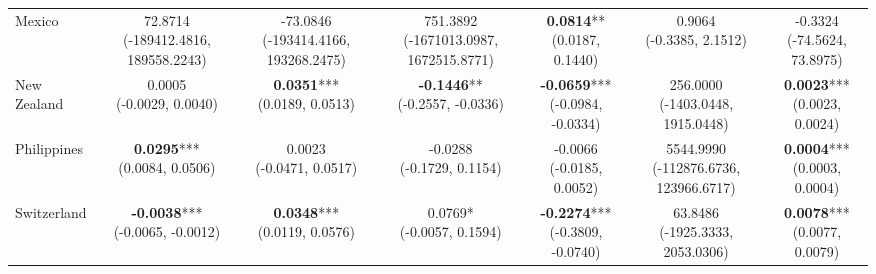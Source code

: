 \documentclass[a4paper,10pt,final]{article}    %
\begin{document}
\begin{table}[htbp]
{\begin{tabular}{l|cccccc}
            Mexico         & \makecell{72.8714                                                                   \\ \scriptsize{(-189412.4816, 189558.2243)}} & \makecell{-73.0846 \\ \scriptsize{(-193414.4166, 193268.2475)}} & \makecell{751.3892 \\ \scriptsize{(-1671013.0987, 1672515.8771)}} & \makecell{\textbf{0.0814}** \\ \scriptsize{(0.0187, 0.1440)}} & \makecell{0.9064 \\ \scriptsize{(-0.3385, 2.1512)}} & \makecell{-0.3324 \\ \scriptsize{(-74.5624, 73.8975)}} \\
            New Zealand    & \makecell{0.0005                                                                    \\ \scriptsize{(-0.0029, 0.0040)}} & \makecell{\textbf{0.0351}*** \\ \scriptsize{(0.0189, 0.0513)}} & \makecell{\textbf{-0.1446}** \\ \scriptsize{(-0.2557, -0.0336)}} & \makecell{\textbf{-0.0659}*** \\ \scriptsize{(-0.0984, -0.0334)}} & \makecell{256.0000 \\ \scriptsize{(-1403.0448, 1915.0448)}} & \makecell{\textbf{0.0023}*** \\ \scriptsize{(0.0023, 0.0024)}} \\
            Philippines    & \makecell{\textbf{0.0295}***                                                        \\ \scriptsize{(0.0084, 0.0506)}} & \makecell{0.0023 \\ \scriptsize{(-0.0471, 0.0517)}} & \makecell{-0.0288 \\ \scriptsize{(-0.1729, 0.1154)}} & \makecell{-0.0066 \\ \scriptsize{(-0.0185, 0.0052)}} & \makecell{5544.9990 \\ \scriptsize{(-112876.6736, 123966.6717)}} & \makecell{\textbf{0.0004}*** \\ \scriptsize{(0.0003, 0.0004)}} \\
            Switzerland    & \makecell{\textbf{-0.0038}***                                                       \\ \scriptsize{(-0.0065, -0.0012)}} & \makecell{\textbf{0.0348}*** \\ \scriptsize{(0.0119, 0.0576)}} & \makecell{0.0769* \\ \scriptsize{(-0.0057, 0.1594)}} & \makecell{\textbf{-0.2274}*** \\ \scriptsize{(-0.3809, -0.0740)}} & \makecell{63.8486 \\ \scriptsize{(-1925.3333, 2053.0306)}} & \makecell{\textbf{0.0078}*** \\ \scriptsize{(0.0077, 0.0079)}} \\

\end{tabular}}
\end{table}
\end{document}
